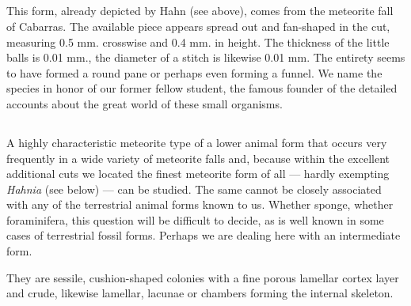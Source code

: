 \documentclass[a4paper, 12pt, oneside]{article}
\begin{document}
\paragraph{\large{}}
\subparagraph{}
This form, already depicted by Hahn (see above), comes from the meteorite fall of Cabarras. The available piece appears spread out and fan-shaped in the cut, measuring 0.5 mm. crosswise and 0.4 mm. in height. The thickness of the little balls is 0.01 mm., the diameter of a stitch is likewise 0.01 mm. The entirety seems to have formed a round pane or perhaps even forming a funnel. We name the species in honor of our former fellow student, the famous founder of the detailed accounts about the great world of these small organisms.
\clearpage
\subsection{}
\subsubsection*{}
\paragraph*{}
A highly characteristic meteorite type of a lower animal form that occurs very frequently in a wide variety of meteorite falls and, because within the excellent additional cuts we located the finest meteorite form of all --- hardly exempting \emph{Hahnia} (see below) --- can be studied. The same cannot be closely associated with any of the terrestrial animal forms known to us. Whether sponge, whether foraminifera, this question will be difficult to decide, as is well known in some cases of terrestrial fossil forms. Perhaps we are dealing here with an intermediate form.

They are sessile, cushion-shaped colonies with a fine porous lamellar cortex layer and crude, likewise lamellar, lacunae or chambers forming the internal skeleton.
\subsubsection{}
\end{document}
